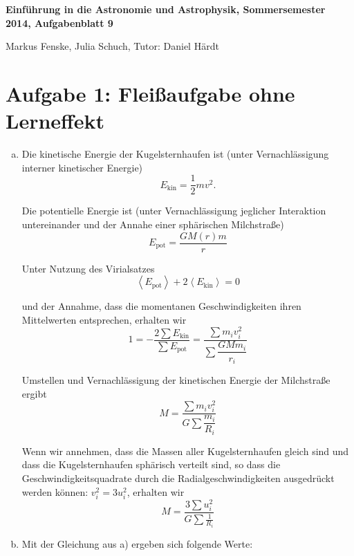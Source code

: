 \documentclass[a4paper,german,12pt,smallheadings]{scrartcl}
\begin{document}
\allowdisplaybreaks %
\begin{center}
\bfseries %
\sffamily %
\vspace{-40pt}
Einführung in die Astronomie und Astrophysik, Sommersemester 2014, Aufgabenblatt 9

Markus Fenske, Julia Schuch, Tutor: Daniel Härdt
\vspace{-10pt}
\end{center}
\section*{Aufgabe 1: Fleißaufgabe ohne Lerneffekt}
\begin{enumerate}[a)]
  \item
    Die kinetische Energie der Kugelsternhaufen ist (unter Vernachlässigung interner kinetischer Energie)
    \begin{equation}
      E_\text{kin} = \frac{1}{2} m v^2.
    \end{equation}

    Die potentielle Energie ist (unter Vernachlässigung jeglicher Interaktion
    untereinander und der Annahe einer sphärischen Milchstraße)
    \begin{equation}
      E_\text{pot} = \frac{GM(r)m}{r}
    \end{equation}

    Unter Nutzung des Virialsatzes
    \begin{equation}
      \left<E_\text{pot}\right> + 2 \left<E_\text{kin}\right> = 0
    \end{equation}

    und der Annahme, dass die momentanen Geschwindigkeiten ihren Mittelwerten
    entsprechen, erhalten wir
    \begin{equation}
      1 = -\frac{2\sum E_\text{kin}}{\sum E_\text{pot}} = \frac{\sum m_i v_i^2}{\sum \dfrac{GM m_i}{r_i}}
    \end{equation}

    Umstellen und Vernachlässigung der kinetischen Energie der Milchstraße
    ergibt
    \begin{equation}
      M = \frac{\sum m_i v_i^2}{G \sum \dfrac{m_i}{R_i}}
    \end{equation}

    Wenn wir annehmen, dass die Massen aller Kugelsternhaufen gleich sind und
    dass die Kugelsternhaufen sphärisch verteilt sind, so dass die
    Geschwindigkeitsquadrate durch die Radialgeschwindigkeiten ausgedrückt
    werden können: $v_i^2 = 3 u_i^2$, erhalten wir
    \begin{equation}
      M = \frac{3 \sum u_i^2}{G \sum \frac{1}{R_i}}
    \end{equation}
  \item Mit der Gleichung aus a) ergeben sich folgende Werte:


\end{enumerate}
\end{document}
